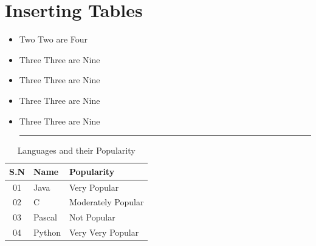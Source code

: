 \documentclass[12pt]{report}
\begin{document}
\section{Inserting Tables}
\begin{itemize}
    \item Two Two are \dotfill Four
    \item Three Three are \dotfill Nine
    \item Three Three are \hspace{1.5in} Nine
    \item Three Three are \hrulefill Nine
    \item Three Three are  Nine\hrule%
\end{itemize}
\begin{table}[h]
    \centering
    \caption{Languages and their Popularity}
    \vspace{0.25in}%
    \begin{tabular}{|c|l|l|}%
    \hline S.N & Name & Popularity \\
    \hline 01 & Java & Very Popular\\
    \hline 02 & C & Moderately Popular\\
    \hline 03 & Pascal & Not Popular\\
    \hline 04 & Python & Very Very Popular\\
    \hline
    \end{tabular}
\end{table}
\end{document}
